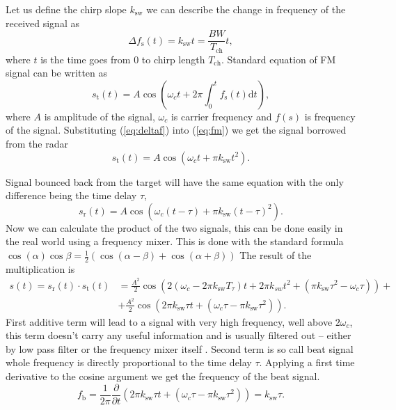 Let us define the chirp slope $k_\mathrm{sw}$ we can describe the change in frequency of the received signal as
\begin{equation}
	\Delta f_\mathrm{s}(t) = k_\mathrm{sw}t = \frac{BW}{T_\mathrm{ch}} t,
	\label{eq:deltaf}
\end{equation}
where $t$ is the time goes from 0 to chirp length $T_\mathrm{ch}$. Standard equation of FM signal can be written as
\begin{equation}
	s_\mathrm{t}(t) = A \cos\left(\omega_c t + 2\pi \int_{0}^{t} f_\mathrm{s}(t) \mathrm{d}t\right),
	\label{eq:fm}
\end{equation}
where $A$ is amplitude of the signal, $\omega_c$ is carrier frequency and $f(s)$ is frequency of the signal. Substituting (\ref{eq:deltaf}) into (\ref{eq:fm}) we get the signal borrowed from the radar
\begin{equation}
	s_\mathrm{t}(t) = A \cos(\omega_c t + \pi k_\mathrm{sw}t^2).
	\label{eq:fm2}
\end{equation}

Signal bounced back from the target will have the same equation with the only difference being the time delay $\tau$,
\begin{equation}
	s_\mathrm{r}(t) = A \cos(\omega_c (t - \tau) + \pi k_\mathrm{sw}(t - \tau)^2).
	\label{eq:fm3}
\end{equation}
Now we can calculate the product of the two signals, this can be done easily in the real world using a frequency mixer. This is done with the standard formula $\cos(\alpha)\cos\beta = \frac{1}{2}(\cos(\alpha-\beta)+\cos(\alpha+\beta))$
The result of the multiplication is
\begin{align}
	s(t) = s_\mathrm{r}(t) \cdot  s_\mathrm{t}(t) &= \frac{A^2}{2}\cos\left(2(\omega_c - 2\pi k_\mathrm{sw}T_\tau)t + 2\pi k_{sw}t^2 + (\pi k_\mathrm{sw} \tau^2 - \omega_c \tau) \right)+ \nonumber \\
	&+\frac{A^2}{2} \cos\left(2\pi k_\mathrm{sw} \tau t + (\omega_c \tau - \pi k_\mathrm{sw} \tau^2)\right).
	\label{eq:fm4}
\end{align}
First additive term will lead to a signal with very high frequency, well above $2\omega_c$, this term doesn't carry any useful information and is usually filtered out -- either by low pass filter or the frequency mixer itself \cite{graham2005}.
Second term is so call beat signal whole frequency is directly proportional to the time delay $\tau$.
Applying a first time derivative to the cosine argument we get the frequency of the beat signal.
\begin{equation}
	f_\mathrm{b} = \frac{1}{2\pi}\frac{\partial}{\partial t} \left(2\pi k_\mathrm{sw} \tau t + (\omega_c \tau - \pi k_\mathrm{sw} \tau^2)\right) = k_\mathrm{sw} \tau.
	\label{eq:fb}
\end{equation}

